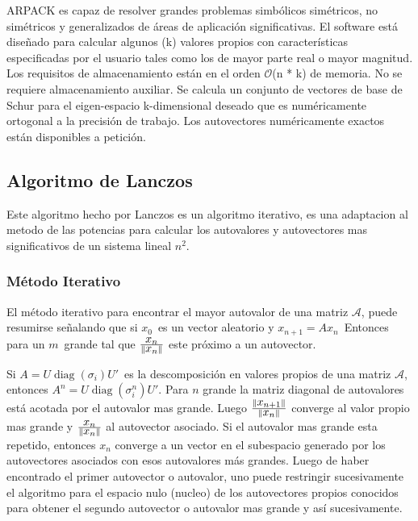 \documentclass[a4paper,openright,12pt, oneside]{book}
\DeclarePairedDelimiter\norm{\lVert}{\rVert}
\DeclareRobustCommand{\orderof}{\ensuremath{\mathcal{O}}}
\begin{document}
ARPACK es capaz de resolver grandes problemas simb\'olicos sim\'etricos, no sim\'etricos y generalizados de \'areas de aplicaci\'on significativas. El software est\'a dise\~nado para calcular algunos (k) valores propios con caracter\'isticas especificadas por el usuario tales como los de mayor parte real o mayor magnitud. Los requisitos de almacenamiento est\'an en el orden \orderof(n * k) de memoria. No se requiere almacenamiento auxiliar. Se calcula un conjunto de vectores de base de Schur para el eigen-espacio k-dimensional deseado que es num\'ericamente ortogonal a la precisi\'on de trabajo. Los autovectores num\'ericamente exactos est\'an disponibles a petici\'on.

\subsection{Algoritmo de Lanczos}

Este algoritmo hecho por Lanczos es un algoritmo iterativo, es una adaptacion al metodo de las potencias para calcular los autovalores y autovectores mas significativos de un sistema lineal $n^{2}$.

\subsubsection{M\'etodo Iterativo}
El m\'etodo iterativo para encontrar el mayor autovalor de una matriz $\mathcal{A}$, puede resumirse se\~nalando que si ${\displaystyle x_{0}\,}$ es un vector aleatorio y ${\displaystyle x_{n+1}=Ax_{n}\,}$
Entonces para un ${\displaystyle m\,}$ grande tal que 
$
\frac{
  \displaystyle x_{n}
} 
{
  \norm{{
    \displaystyle x_{n} 
    }}
} 
$ este pr\'oximo a un autovector.

Si ${\displaystyle A=U\operatorname {diag} (\sigma _{i})U'\,} $ es la descomposici\'on en valores propios de una matriz $\mathcal{A}$, entonces ${\displaystyle A^{n}=U\operatorname {diag} (\sigma _{i}^{n})U'}$. Para $\displaystyle n$ grande la matriz diagonal de autovalores est\'a acotada por el autovalor mas grande. Luego 
$
\frac{
  \norm{{\displaystyle x_{n+1}}}
} 
{
  \norm{{
    \displaystyle x_{n} 
    }}
} 
$ converge al valor propio mas grande y 
$
\frac{
  \displaystyle x_{n}
} 
{
  \norm{{
    \displaystyle x_{n} 
    }}
} 
$ al autovector asociado. Si el autovalor mas grande esta repetido, entonces $\displaystyle x_{n} $ converge a un vector en el subespacio generado por los autovectores asociados con esos autovalores m\'as grandes. Luego de haber encontrado el primer autovector o autovalor, uno puede restringir sucesivamente el algoritmo para el espacio nulo (nucleo) de los autovectores propios conocidos para obtener el segundo autovector o autovalor mas grande y as\'i sucesivamente.
\end{document}
